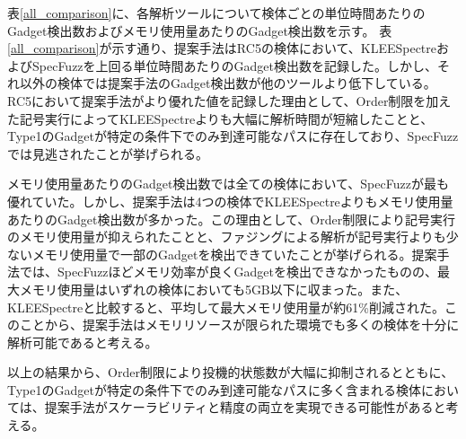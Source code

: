表\ref{all_comparison}に、各解析ツールについて検体ごとの単位時間あたりのGadget検出数およびメモリ使用量あたりのGadget検出数を示す。
表\ref{all_comparison}が示す通り、提案手法はRC5の検体において、KLEESpectreおよびSpecFuzzを上回る単位時間あたりのGadget検出数を記録した。しかし、それ以外の検体では提案手法のGadget検出数が他のツールより低下している。RC5において提案手法がより優れた値を記録した理由として、Order制限を加えた記号実行によってKLEESpectreよりも大幅に解析時間が短縮したことと、Type1のGadgetが特定の条件下でのみ到達可能なパスに存在しており、SpecFuzzでは見逃されたことが挙げられる。\par
メモリ使用量あたりのGadget検出数では全ての検体において、SpecFuzzが最も優れていた。しかし、提案手法は4つの検体でKLEESpectreよりもメモリ使用量あたりのGadget検出数が多かった。この理由として、Order制限により記号実行のメモリ使用量が抑えられたことと、ファジングによる解析が記号実行よりも少ないメモリ使用量で一部のGadgetを検出できていたことが挙げられる。提案手法では、SpecFuzzほどメモリ効率が良くGadgetを検出できなかったものの、最大メモリ使用量はいずれの検体においても5GB以下に収まった。また、KLEESpectreと比較すると、平均して最大メモリ使用量が約61\%削減された。このことから、提案手法はメモリリソースが限られた環境でも多くの検体を十分に解析可能であると考える。\par

以上の結果から、Order制限により投機的状態数が大幅に抑制されるとともに、Type1のGadgetが特定の条件下でのみ到達可能なパスに多く含まれる検体においては、提案手法がスケーラビリティと精度の両立を実現できる可能性があると考える。\par
